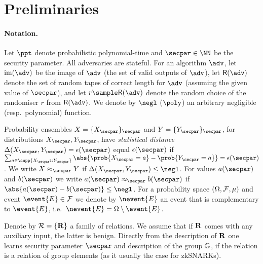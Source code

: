 \section{Preliminaries}
\label{sec:preliminaries}
\paragraph{Notation.} Let $\ppt$ denote probabilistic polynomial-time and $\secpar \in \NN$ be the
security parameter. All adversaries are stateful. For an algorithm $\adv$, let
$\image (\adv)$ be the image of $\adv$ (the set of valid outputs of $\adv$), let
$\RND{\adv}$ denote the set of random tapes of correct length for $\adv$
(assuming the given value of $\secpar$), and let $r \sample \RND{\adv}$ denote
the random choice of the randomiser $r$ from $\RND{\adv}$. We denote by $\negl$
($\poly$) an arbitrary negligible (resp.~polynomial) function.

Probability ensembles $X = \smallset{X_\secpar}_\secpar$ and $Y =
\smallset{Y_\secpar}_\secpar$, for distributions $X_\secpar, Y_\secpar$, have
\emph{statistical distance} $\SD(X_\secpar, Y_\secpar)=\epsilon(\secpar)$ equal $\epsilon(\secpar)$ if $\sum_{a \in
  \supp{X_\secpar \cup Y_\secpar}} \abs{\prob{X_\secpar = a} - \prob{Y_\secpar =
    a}} = \epsilon(\secpar)$. We write $X \approx_\secpar Y$ if $\SD(X_\secpar,
Y_\secpar) \leq \negl$. For values $a(\secpar)$ and $b(\secpar)$ we write
$a(\secpar) \approx_\secpar b(\secpar)$ if $\abs{a(\secpar) - b(\secpar)} \leq
\negl$.
For a probability space $(\Omega, \mathcal{F}, \mu)$ and event
$\event{E} \in \eventspace$ we denote by $\nevent{E}$ an event that is
complementary to $\event{E}$,
i.e.~$\nevent{E} = \samplespace \setminus \event{E}$.


Denote by $\mathcal{R} = \{\mathbf{R}\}$ a family of relations. We assume that if
$\mathbf{R}$ comes with any auxiliary input, the latter is benign. Directly from the
description of $\mathbf{R}$ one learns security parameter $\secpar$ and description of the
group $\mathbb{G}$, if the relation is a relation of group elements (as it usually the case for zkSNARKs).


